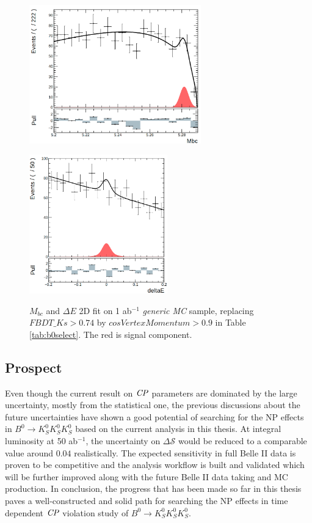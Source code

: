 \begin{figure}[htbp]
	\begin{minipage}[b]{0.5\linewidth}
		\centering 
		\includegraphics[height=6cm]{figures/mbcfit_noksdata.png}
		\label{}
	\end{minipage}
	\begin{minipage}[b]{0.5\linewidth}
		\centering 
		\includegraphics[height=6cm]{figures/dEfit_noksdata.png}
		\label{}
	\end{minipage}
	\caption{$M_{bc}$ and $\Delta E$ 2D fit on 1 ab$^{-1}$ \textit{generic MC} sample, replacing $FBDT\_Ks>0.74$ by ${cosVertexMomentum}>0.9$ in Table \ref{tab:b0select}. The red is signal component.}
	\label{fig:2Ddata_noks}
\end{figure}


\subsection{Prospect}
Even though the current result on $\it{CP}$ parameters are dominated by the large uncertainty, mostly from the statistical one, the previous discussions about the future uncertainties have shown a good potential of searching for the NP effects in $B^0 \to K_S^0  K_S^0  K_S^0$ based on the current analysis in this thesis. At integral luminosity at 50 ab$^{-1}$, the uncertainty on $\Delta \mathcal{S}$ would be reduced to a comparable value around $0.04$ realistically. The expected sensitivity in full Belle II data is proven to be competitive and the analysis workflow is built and validated which will be further improved along with the future Belle II data taking and MC production. In conclusion, the progress that has been made so far in this thesis paves a well-constructed and solid path for searching the NP effects in time dependent $\it{CP}$ violation study of $B^0 \to K_S^0  K_S^0  K_S^0$. 
 
 

